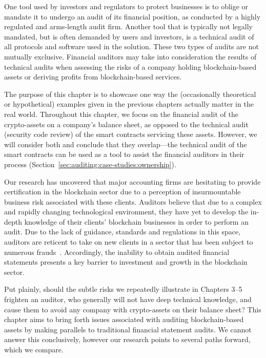 One tool used by investors and regulators to protect businesses is to oblige or mandate it to undergo an audit of its financial position, as conducted by a highly regulated and arms-length audit firm. Another tool that is typically not legally mandated, but is often demanded by users and investors, is a technical audit of all protocols and software used in the solution. These two types of audits are not mutually exclusive. Financial auditors may take into consideration the results of technical audits when assessing the risks of a company holding blockchain-based assets or deriving profits from blockchain-based services. 

The purpose of this chapter is to showcase one way the (occasionally theoretical or hypothetical) examples given in the previous chapters actually matter in the real world. Throughout this chapter, we focus on the financial audit of the crypto-assets on a company's balance sheet, as opposed to the technical audit (\eg security code review) of the smart contracts servicing these assets. However, we will consider both and conclude that they overlap---the technical audit of the smart contracts can be used as a tool to assist the financial auditors in their process (\eg Section~\ref{sec:auditing:case-studies:ownership}).

Our research has uncovered that major accounting firms are hesitating to provide certification in the blockchain sector due to a perception of insurmountable business risk associated with these clients. Auditors believe that due to a complex and rapidly changing technological environment, they have yet to develop the in-depth knowledge of their clients' blockchain businesses in order to perform an audit. Due to the lack of guidance, standards and regulations in this space, auditors are reticent to take on new clients in a sector that has been subject to numerous frauds~\cite{abreu2018blockchain}. Accordingly, the inability to obtain audited financial statements presents a key barrier to investment and growth in the blockchain sector. 

Put plainly, should the subtle risks we repeatedly illustrate in Chapters 3--5 frighten an auditor, who generally will not have deep technical knowledge, and cause them to avoid any company with crypto-assets on their balance sheet? This chapter aims to bring forth issues associated with auditing blockchain-based assets by making parallels to traditional financial statement audits. We cannot answer this conclusively, however our research points to several paths forward, which we compare.


